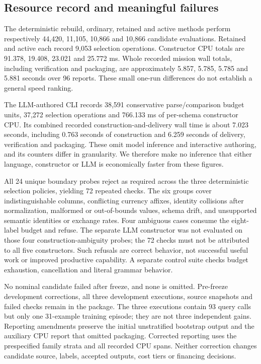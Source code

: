 \documentclass[11pt,letterpaper]{article}
\begin{document}
\subsection{Resource record and meaningful failures}

The deterministic rebuild, ordinary, retained and active methods perform respectively 44,420, 11,105, 10,866 and 10,866 candidate evaluations. Retained and active each record 9,053 selection operations. Constructor CPU totals are 91.378, 19.408, 23.021 and 25.772 ms. Whole recorded mission wall totals, including verification and packaging, are approximately 5.857, 5.785, 5.785 and 5.881 seconds over 96 reports. These small one-run differences do not establish a general speed ranking.

The LLM-authored CLI records 38,591 conservative parse/comparison budget units, 37,272 selection operations and 766.133 ms of per-schema constructor CPU. Its combined recorded construction-and-delivery wall time is about 7.023 seconds, including 0.763 seconds of construction and 6.259 seconds of delivery, verification and packaging. These omit model inference and interactive authoring, and its counters differ in granularity. We therefore make no inference that either language, constructor or LLM is economically faster from these figures.

All 24 unique boundary probes reject as required across the three deterministic selection policies, yielding 72 repeated checks. The six groups cover indistinguishable columns, conflicting currency affixes, identity collisions after normalization, malformed or out-of-bounds values, schema drift, and unsupported semantic identities or exchange rates. Four ambiguous cases consume the eight-label budget and refuse. The separate LLM constructor was not evaluated on those four construction-ambiguity probes; the 72 checks must not be attributed to all five constructors. Such refusals are correct behavior, not successful useful work or improved productive capability. A separate control suite checks budget exhaustion, cancellation and literal grammar behavior.

No nominal candidate failed after freeze, and none is omitted. Pre-freeze development corrections, all three development executions, source snapshots and failed checks remain in the package. The three executions contain 93 query calls but only one 31-example training episode; they are not three independent gains. Reporting amendments preserve the initial unstratified bootstrap output and the auxiliary CPU report that omitted packaging. Corrected reporting uses the prespecified family strata and all recorded CPU spans. Neither correction changes candidate source, labels, accepted outputs, cost tiers or financing decisions.
\end{document}

